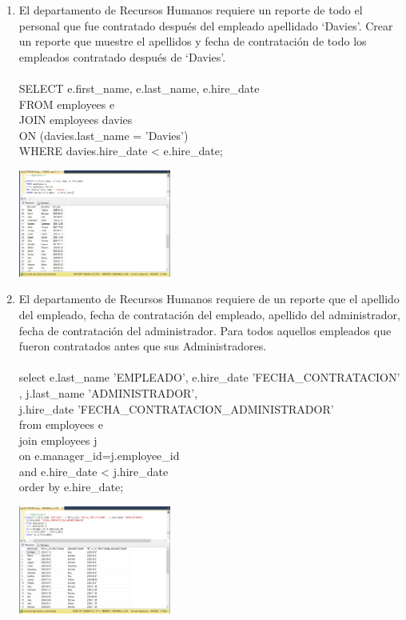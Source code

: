 \begin{enumerate}[1.]
	\item El departamento de Recursos Humanos requiere un reporte de todo el personal que fue contratado después del empleado apellidado ‘Davies’. Crear un reporte que muestre el apellidos y fecha de contrataci\'on de todo los empleados contratado después de ‘Davies’.
	\\
	\\SELECT e.first\_name, e.last\_name, e.hire\_date 
	\\FROM employees e 
	\\JOIN employees davies 
	\\ON (davies.last\_name = 'Davies') 
	\\WHERE davies.hire\_date < e.hire\_date;

	\begin{center}
	\includegraphics[width=5cm]{./Imagenes/8ejer7} 
	\end{center}


	\item El departamento de Recursos Humanos requiere de un reporte que el apellido del empleado, fecha de contrataci\'on del empleado, apellido del administrador, fecha de contratación del administrador. Para todos aquellos empleados que fueron contratados antes que sus Administradores.
	\\
	\\select e.last\_name 'EMPLEADO', e.hire\_date 'FECHA\_CONTRATACION' , j.last\_name 'ADMINISTRADOR', 
	\\j.hire\_date 'FECHA\_CONTRATACION\_ADMINISTRADOR'
	\\from employees e 
	\\join employees j 
	\\on e.manager\_id=j.employee\_id 
	\\and e.hire\_date < j.hire\_date 
	\\order by e.hire\_date;

	\begin{center}
	\includegraphics[width=5cm]{./Imagenes/8ejer8} 
	\end{center}

	\end{enumerate}
	


